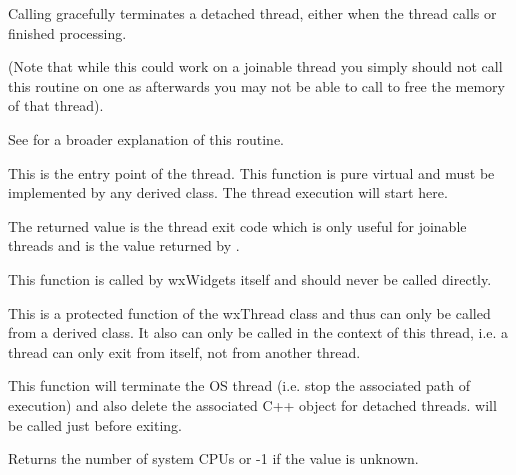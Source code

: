 \label{wxthreaddelete}


Calling  gracefully terminates a 
detached thread, either when the thread calls  or finished processing.

(Note that while this could work on a joinable thread you simply should not
call this routine on one as afterwards you may not be able to call 
 to free the memory of that thread).

See  for a broader explanation of this routine.


\label{wxthreadentry}


This is the entry point of the thread. This function is pure virtual and must
be implemented by any derived class. The thread execution will start here.

The returned value is the thread exit code which is only useful for
joinable threads and is the value returned by .

This function is called by wxWidgets itself and should never be called
directly.


\label{wxthreadexit}


This is a protected function of the wxThread class and thus can only be called
from a derived class. It also can only be called in the context of this
thread, i.e. a thread can only exit from itself, not from another thread.

This function will terminate the OS thread (i.e. stop the associated path of
execution) and also delete the associated C++ object for detached threads.
 will be called just before exiting.


\label{wxthreadgetcpucount}


Returns the number of system CPUs or -1 if the value is unknown.



